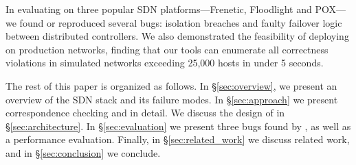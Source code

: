 {In evaluating \projectname{} on
three popular SDN platforms---Frenetic, Floodlight and POX---we found or reproduced several bugs:
isolation breaches and faulty failover logic between distributed controllers.
We also demonstrated the feasibility of deploying
\projectname{} on production networks,
finding that our tools can enumerate all correctness violations in
simulated networks exceeding 25,000 hosts in under 5 seconds.

The rest of this paper is organized as follows. In \S\ref{sec:overview},
we present an overview of the SDN stack and its failure modes.
In \S\ref{sec:approach} we present correspondence checking and
\simulator{} in detail. We discuss the design of \projectname{} in
\S\ref{sec:architecture}. In \S\ref{sec:evaluation} we present
three bugs found by \projectname{}, as well as a performance evaluation.
Finally, in \S\ref{sec:related_work} we discuss related work,
and in \S\ref{sec:conclusion} we conclude.


\eat{
}}

